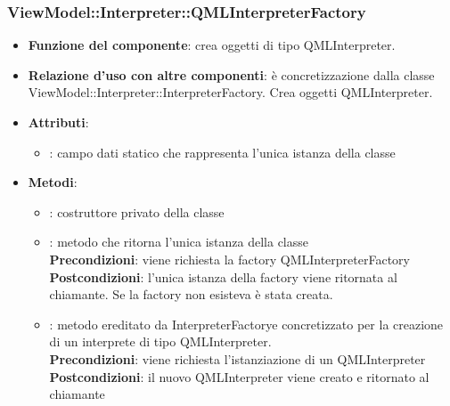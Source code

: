 \subsubsection{ViewModel::Interpreter::QMLInterpreterFactory}
\begin{itemize}
\item\textbf{Funzione del componente}: crea oggetti di tipo QMLInterpreter.
	\item\textbf{Relazione d'uso con altre componenti}: è concretizzazione dalla classe\\ ViewModel::Interpreter::InterpreterFactory. Crea oggetti QMLInterpreter.\\
\item\textbf{Attributi}:
	\begin{itemize}
		\item{}: campo dati statico che rappresenta l'unica istanza della classe\\
	\end{itemize}
\item\textbf{Metodi}:
	\begin{itemize}
		\item{}: costruttore privato della classe\\
		\item{}: metodo che ritorna l'unica istanza della classe\\
		\textbf{Precondizioni}: viene richiesta la factory QMLInterpreterFactory\\
		\textbf{Postcondizioni}: l'unica istanza della factory viene ritornata al chiamante. Se la factory non esisteva è stata creata.\\
		\item{}: metodo ereditato da InterpreterFactorye concretizzato per la creazione di un interprete di tipo QMLInterpreter.\\
		\textbf{Precondizioni}: viene richiesta l'istanziazione di un QMLInterpreter\\
		\textbf{Postcondizioni}: il nuovo QMLInterpreter viene creato e ritornato al chiamante\\
	\end{itemize}
\end{itemize}

